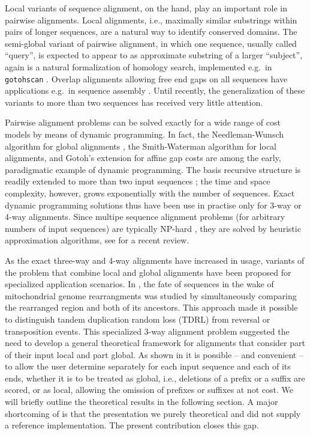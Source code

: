 \documentclass[a4paper,10pt]{article}
\begin{document}
Local variants of sequence alignment, on the hand, play an important role
in pairwise alignments. Local alignments, i.e., maximally similar
substrings within pairs of longer sequences, are a natural way to identify
conserved domains.  The semi-global variant of pairwise alignment, in which
one sequence, usually called ``query'', is expected to appear to as
approximate substring of a larger ``subject'', again is a natural
formalization of homology search, implemented e.g.\ in \texttt{gotohscan}
\cite{Hertel:09a}.  Overlap alignments
\cite{Jones:04} allowing free end gaps on all sequences have applications
e.g.\ in sequence assembly \cite{Rausch:09}. Until recently, the
generalization of these variants to more than two sequences has received
very little attention.

Pairwise alignment problems can be solved exactly for a wide range of cost
models by means of dynamic programming. In fact, the Needleman-Wunsch
algorithm for global alignments \cite{Needleman:70}, the Smith-Waterman
algorithm for local alignments, and Gotoh's extension for affine gap costs
\cite{Gotoh:82} are among the early, paradigmatic example of dynamic
programming. The basis recursive structure is readily extended to more than
two input sequences \cite{Carillo:88,Lipman:89}; the time and space
complexity, however, grows exponentially with the number of
sequences. Exact dynamic programming solutions thus have been use in
practise only for 3-way \cite{Gotoh:86,Dewey:01,Konagurthu:04,Kruspe:07a}
or 4-way \cite{Steiner:11a} alignments. Since multipe sequence alignment
problems (for arbitrary numbers of input sequences) are typically NP-hard
\cite{Kececioglu:93,Wang:94,Bonizzoni:01,Just:01,Manthey:03,Elias:06}, they
are solved by heuristic approximation algorithms, see \cite{Baichoo:17} for
a recent review.

As the exact three-way and 4-way alignments have increased in usage,
variants of the problem that combine local and global alignments have been
proposed for specialized application scenarios. In \cite{AlArab:17a}, the
fate of sequences in the wake of mitochondrial genome rearrangments was
studied by simultaneously comparing the rearranged region and both of its
ancestors. This approach made it possible to distinguish tandem duplication
random loss (TDRL) from reversal or transposition events. This specialized
3-way alignment problem suggested the need to develop a general theoretical
framework for alignments that consider part of their input local and part
global. As shown in \cite{Retzlaff:18a} it is possible -- and convenient --
to allow the user determine separately for each input sequence and each of
its ends, whether it is to be treated as global, i.e., deletions of a
prefix or a suffix are scored, or as local, allowing the omission of
prefixes or suffixes at not cost. We will briefly outline the theoretical
results in the following section. A major shortcoming of
\cite{Retzlaff:18a} is that the presentation we purely theoretical and did
not supply a reference implementation. The present contribution closes this
gap.
\end{document}
